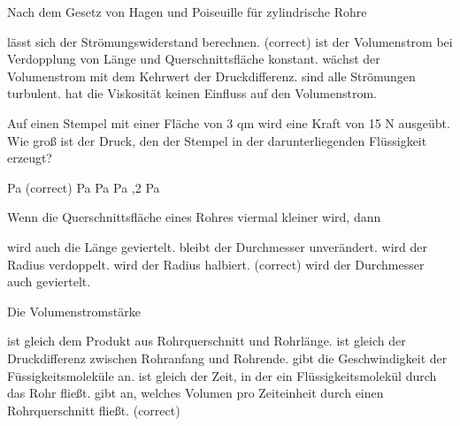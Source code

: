 \documentclass[11pt]{exam}
\begin{document}
\setlength{\voffset}{-0.5in}
\setlength{\headsep}{5pt}

\hspace{2mm}
 \hspace{5mm}
\vspace{4mm}

\begin{questions}

\question Nach dem Gesetz von Hagen und Poiseuille für zylindrische Rohre

\begin{choices}
	\choice lässt sich der Strömungswiderstand berechnen. (correct)
	\choice ist der Volumenstrom bei Verdopplung von Länge und Querschnittsfläche konstant.
	\choice wächst der Volumenstrom mit dem Kehrwert der Druckdifferenz.
	\choice sind alle Strömungen turbulent.
	\choice hat die Viskosität keinen Einfluss auf den Volumenstrom.
\end{choices}

\vspace{3mm}\question Auf einen Stempel mit einer Fläche von 3 qm wird eine Kraft von 15 N ausgeübt. Wie groß ist der Druck, den der Stempel in der darunterliegenden Flüssigkeit erzeugt?

\begin{choices}
	 Pa (correct)
	 Pa
	 Pa
	 Pa
	,2 Pa
\end{choices}

\vspace{3mm}\question Wenn die Querschnittsfläche eines Rohres viermal kleiner wird, dann

\begin{choices}
	\choice wird auch die Länge geviertelt.
	\choice bleibt der Durchmesser unverändert.
	\choice wird der Radius verdoppelt.
	\choice wird der Radius halbiert. (correct)
	\choice wird der Durchmesser auch geviertelt.
\end{choices}

\vspace{3mm}\question Die Volumenstromstärke

\begin{choices}
	\choice ist gleich dem Produkt aus Rohrquerschnitt und Rohrlänge.
	\choice ist gleich der Druckdifferenz zwischen Rohranfang und Rohrende.
	\choice gibt die Geschwindigkeit der Füssigkeitsmoleküle an.
	\choice ist gleich der Zeit, in der ein Flüssigkeitsmolekül durch das Rohr fließt.
	\choice gibt an, welches Volumen pro Zeiteinheit durch einen Rohrquerschnitt fließt. (correct)
\end{choices}


\end{questions}
\end{document}
